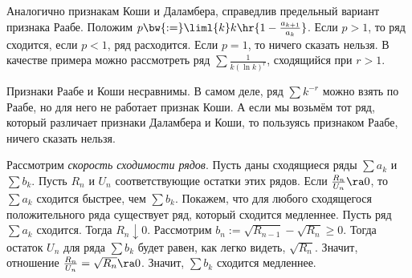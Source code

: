\documentclass[a4paper]{article}
\begin{document}
Аналогично признакам Коши и Даламбера, справедлив предельный вариант признака Раабе. Положим $p\bw{:=}\liml{k} k\hr{ 1-\frac{a_{k+1}}{a_k}} $. Если $p > 1$, то
ряд сходится, если $p < 1$, ряд расходится. Если $p=1$, то ничего сказать нельзя. В качестве примера можно рассмотреть ряд $\sum \frac{1}{k(\ln k)^r}$,
сходящийся при $r > 1$.

\begin{note}
Признаки Раабе и Коши несравнимы. В самом деле, ряд $\sum k^{-r}$ можно взять по Раабе, но для него не работает признак Коши.
А если мы возьмём тот ряд, который различает признаки Даламбера и Коши, то пользуясь признаком Раабе, ничего сказать нельзя.
\end{note}

Рассмотрим \emph{скорость сходимости рядов}. Пусть даны сходящиеся ряды $\sum a_k$ и $\sum b_k$. Пусть $R_n$ и $U_n$
соответствующие остатки этих рядов. Если $\frac{R_n}{U_n} \ra 0$, то $\sum a_k$ сходится быстрее, чем $\sum b_k$.
Покажем, что для любого сходящегося положительного ряда существует ряд, который сходится медленнее. Пусть ряд
$\sum a_k$ сходится. Тогда $R_n \downarrow 0$. Рассмотрим $b_n := \sqrt{R_{n-1}} - \sqrt{R_n} \ge 0$. Тогда
остаток $U_n$ для ряда $\sum b_k$ будет равен, как легко видеть, $\sqrt{R_n}$.
Значит, отношение $\frac{R_n}{U_n}=\sqrt{R_n} \ra 0$. Значит, $\sum b_k$ сходится медленнее.
\end{document}
